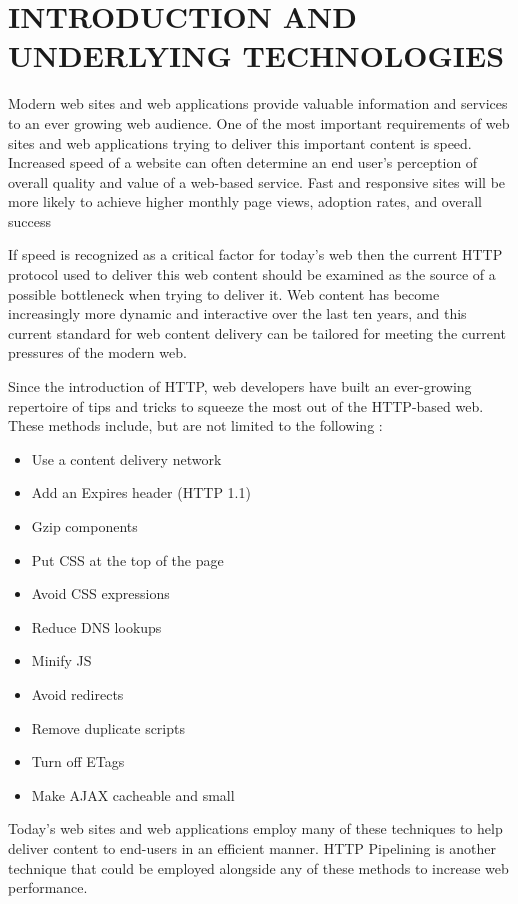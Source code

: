 \documentclass[12pt]{report}
\begin{document}
\chapter{INTRODUCTION AND UNDERLYING TECHNOLOGIES}

Modern web sites and web applications provide valuable information and services to an ever growing web audience. One of the most important requirements of web sites and web applications trying to deliver this important content is speed. Increased speed of a website can often determine an end user's perception of overall quality and value of a web-based service. Fast and responsive sites will be more likely to achieve higher monthly page views, adoption rates, and overall success

If speed is recognized as a critical factor for today's web then the current HTTP protocol used to deliver this web content should be examined as the source of a possible bottleneck when trying to deliver it. Web content has become increasingly more dynamic and interactive over the last ten years, and this current standard for web content delivery can be tailored for meeting the current pressures of the modern web.

Since the introduction of HTTP, web developers have built an ever-growing repertoire of tips and tricks to squeeze the most out of the HTTP-based web. These methods include, but are not limited to the following \cite{highPerformanceWebsites}:

\begin{itemize}
	\item Use a content delivery network
	\item Add an Expires header (HTTP 1.1)
	\item Gzip components
	\item Put CSS at the top of the page
	\item Avoid CSS expressions
	\item Reduce DNS lookups
	\item Minify JS
	\item Avoid redirects
	\item Remove duplicate scripts
	\item Turn off ETags
	\item Make AJAX cacheable and small
\end{itemize}

Today's web sites and web applications employ many of these techniques to help deliver content to end-users in an efficient manner. HTTP Pipelining is another technique that could be employed alongside any of these methods to increase web performance.
\end{document}
